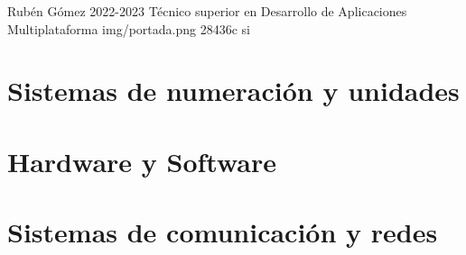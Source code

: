 \documentclass{\ClassPath/yukibook}
\begin{document}
    {Rubén Gómez}  %
    {2022-2023}    %
    {Técnico superior en \linebreak Desarrollo de  Aplicaciones Multiplataforma} %
    {}%
    {}%
    {img/portada.png} %
    {28436c}
    {si} %

    \coverpage

    \tableofcontents


    \part{Sistemas de numeración y unidades}
    \graphicspath{{../../../temas_comunes/sistemas_de_numeracion/img}}
    

    \graphicspath{{../../../temas_comunes/unidades_informacion/img}}
    

    \vfill
    \pagebreak

    \part{Hardware y Software}
    \graphicspath{{img/si/}}
    

    

    \graphicspath{{../../../temas_comunes/particionado_sistemas_ficheros_raid/img}}
    

    \graphicspath{{img/si/}}
%    


    \part{Sistemas de comunicación y redes}
    \graphicspath{{../../../temas_comunes/sistemas_de_comunicacion/img}}
    

    \graphicspath{{../../../temas_comunes/introduccion_a_redes/img}}
    
\end{document}
